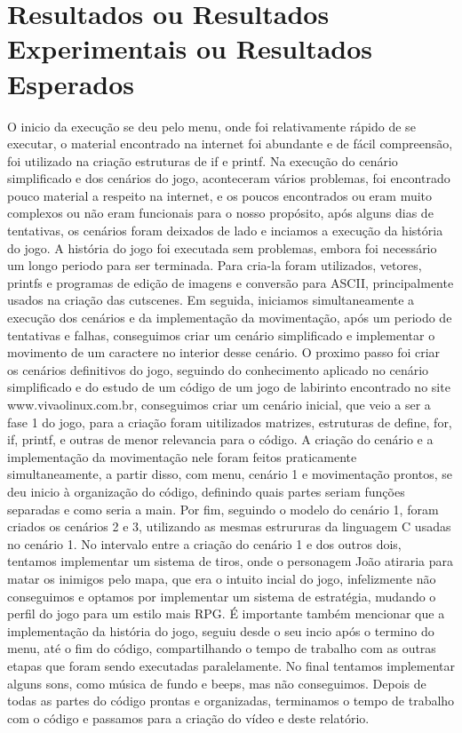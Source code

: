 \documentclass[journal]{IEEEtran}
\begin{document}
\section{Resultados ou Resultados Experimentais ou Resultados Esperados}
O inicio da execução se deu pelo menu, onde foi relativamente rápido de se executar, o material encontrado na internet foi abundante e de fácil compreensão, foi utilizado na criação estruturas de if e printf.
Na execução do cenário simplificado e dos cenários do jogo, aconteceram vários problemas, foi encontrado pouco material a respeito na internet, e os poucos encontrados ou eram muito complexos ou não eram funcionais para o nosso propósito, após alguns dias de tentativas, os cenários foram deixados de lado e inciamos a execução da história do jogo.
A história do jogo foi executada sem problemas, embora foi necessário um longo periodo para ser terminada. Para cria-la foram utilizados, vetores, printfs e programas de edição de imagens e conversão para ASCII, principalmente usados na criação das cutscenes.
Em seguida, iniciamos simultaneamente a execução dos cenários e da implementação da movimentação, após um periodo de tentativas e falhas, conseguimos criar um cenário simplificado e implementar o movimento de um caractere no interior desse cenário. O proximo passo foi criar os cenários definitivos do jogo, seguindo do conhecimento aplicado no cenário simplificado e do estudo de um código de um jogo de labirinto encontrado no site www.vivaolinux.com.br, conseguimos criar um cenário inicial, que veio a ser a fase 1 do jogo, para a criação foram uitilizados matrizes, estruturas de define, for, if, printf, e outras de menor relevancia para o código.
A criação do cenário e a implementação da movimentação nele foram feitos praticamente simultaneamente, a partir disso, com menu, cenário 1 e movimentação prontos, se deu inicio à organização do código, definindo quais partes seriam funções separadas e como seria a main.
Por fim, seguindo o modelo do cenário 1, foram criados os cenários 2 e 3, utilizando as mesmas estrururas da linguagem C usadas no cenário 1.
No intervalo entre a criação do cenário 1 e dos outros dois, tentamos implementar um sistema de tiros, onde o personagem João atiraria para matar os inimigos pelo mapa, que era o intuito incial do jogo, infelizmente não conseguimos e optamos por implementar um sistema de estratégia, mudando o perfil do jogo para um estilo mais RPG.
É importante também mencionar que a implementação da história do jogo, seguiu desde o seu incio após o termino do menu, até o fim do código, compartilhando o  tempo de trabalho com as outras etapas que foram sendo executadas paralelamente.
No final tentamos implementar alguns sons, como música de fundo e beeps, mas não conseguimos.
Depois de todas as partes do código prontas e organizadas, terminamos o tempo de trabalho com o código e passamos para a criação do vídeo e deste relatório.
\end{document}
